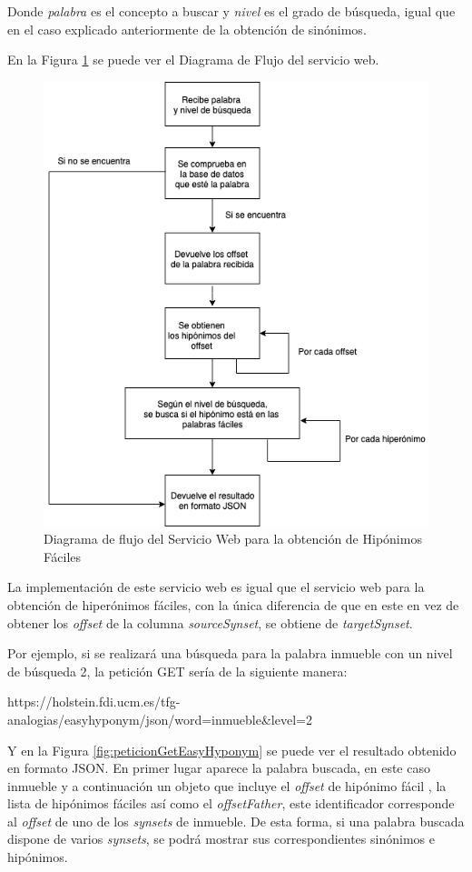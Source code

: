 Donde \textit{palabra} es el concepto a buscar y \textit{nivel} es el grado de búsqueda, igual que en el caso explicado anteriormente de la obtención de sinónimos.

En la Figura \ref{fig:swhiponimos} se puede ver el Diagrama de Flujo del servicio web.
\begin{figure}[!h]
	\includegraphics[width=.9\textwidth]{Imagenes/Bitmap/Capitulo4/ServiciosWeb/DiagramaFlujoHiponimos.png}
	\centering
	\caption{Diagrama de flujo del Servicio Web para la obtención de Hipónimos Fáciles}
	\label{fig:swhiponimos}
\end{figure}

La implementación de este servicio web es igual que el servicio web para la obtención de hiperónimos fáciles, con la única diferencia de que en este en vez de obtener los \textit{offset} de la columna \textit{sourceSynset}, se obtiene de \textit{targetSynset}.


Por ejemplo, si se realizará una búsqueda para la palabra inmueble con un nivel de búsqueda 2, la petición GET sería de la siguiente manera:

https://holstein.fdi.ucm.es/tfg-analogias/easyhyponym/json/word=inmueble\&level=2

Y en la Figura \ref{fig:peticionGetEasyHyponym} se puede ver el resultado obtenido en formato JSON. En primer lugar aparece la palabra buscada, en este caso inmueble y a continuación un objeto que incluye el \textit{offset} de hipónimo fácil , la lista de hipónimos fáciles así como el \textit{offsetFather}, este identificador corresponde al \textit{offset} de uno de los \textit{synsets} de inmueble. De esta forma, si una palabra buscada dispone de varios \textit{synsets}, se podrá mostrar sus correspondientes sinónimos e hipónimos.

